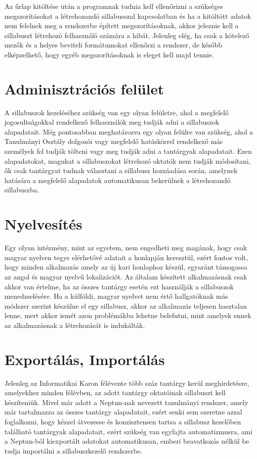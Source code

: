 \documentclass[hidelinks, 12pt, a4paper]{report}
\begin{document}
Az űrlap kitöltése után a programnak tudnia kell ellenőrizni a szükséges megszorításokat a létrehozandó sillabusszal kapcsolatban és ha a kitöltött adatok nem felelnek meg a rendszerbe épített megszorításoknak, akkor jeleznie kell a sillabuszt létrehozó felhasználó számára a hibát. Jelenleg elég, ha csak a kötelező mezők és a helyes beviteli formátumokat ellenőrzi a rendszer, de később elképzelhető, hogy egyéb megszorításoknak is eleget kell majd tennie.

\section{Adminisztrációs felület}

A sillabuszok kezeléséhez szükség van egy olyan felületre, ahol a megfelelő jogosultságokkal rendelkező felhasználók meg tudják adni a sillabuszok alapadatait. Még pontosabban meghatározva egy olyan felülre van szükség, ahol a Tanulmányi Osztály dolgozói vagy megfelelő hatáskörrel rendelkező más személyek fel tudják tölteni vagy meg tudják adni a tantárgyak alapadatait. Ezen alapadatokat, magukat a sillabuszokat létrehozó oktatók nem tudják módosítani, ők csak tantárgyat tudnak választani a sillabusz hozzáadása során, amelynek hatására a megfelelő alapadatok automatikusan bekerülnek a létrehozandó sillabuszba.

\section{Nyelvesítés}

Egy olyan intézmény, mint az egyetem, nem engedheti meg magának, hogy csak magyar nyelven tegye elérhetővé adatait a honlapján keresztül, ezért fontos volt, hogy minden alkalmazás amely az új kari honlaphoz készül, egyaránt támogassa az angol és magyar nyelvű lokalizációt. Az általam készített alkalmazásnak csak akkor van értelme, ha az összes tantárgy esetén ezt használják a sillabuszok menedzselésére. Ha a külföldi, magyar nyelvet nem értő hallgatóknak más módszer szerint készülne el egy sillabusz, akkor az alkalmazás teljesen hasztalan lenne, mert akkor ismét azon problémákba lehetne belefutni, mint amelyek ennek az alkalmazásnak a létrehozását is indukálták.

\section{Exportálás, Importálás}

Jelenleg az Informatikai Karon félévente több száz tantárgy kerül meghirdetésre, amelyekhez minden félévben, az adott tantárgy oktatóinak sillabuszt kell készíteniük. Mivel már adott a Neptun-nak nevezett tanulmányi rendszer, amely már tartalmazza az összes tantárgy alapadatait, ezért senki sem szeretne azzal foglalkozni, hogy kézzel átvezesse és konzisztensen tartsa a sillabusz kezelőben található tantárgyak alapadatait, ezért szükség van egyfajta automatizmusra, ami a Neptun-ból kiexportált adatokat automatikusan, emberi beavatkozás nélkül be tudja importálni a sillabuszkezelő rendszerbe.
\end{document}
